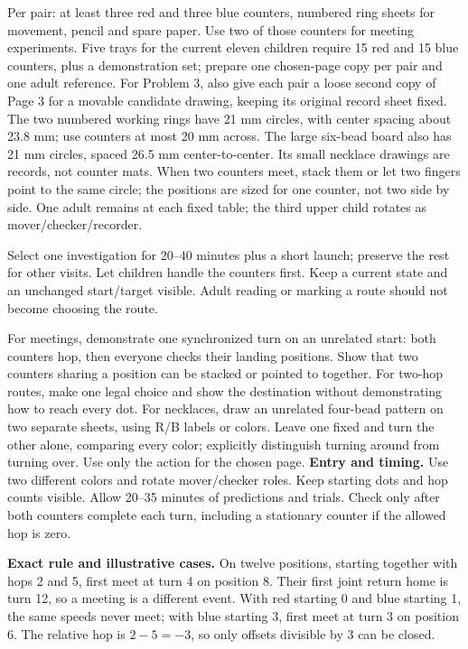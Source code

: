 Per pair: at least three red and three blue counters, numbered ring sheets for movement, pencil and spare paper. Use two of those counters for meeting experiments. Five trays for the current eleven children require 15 red and 15 blue counters, plus a demonstration set; prepare one chosen-page copy per pair and one adult reference. For Problem 3, also give each pair a loose second copy of Page 3 for a movable candidate drawing, keeping its original record sheet fixed. The two numbered working rings have 21 mm circles, with center spacing about 23.8 mm; use counters at most 20 mm across. The large six-bead board also has 21 mm circles, spaced 26.5 mm center-to-center. Its small necklace drawings are records, not counter mats. When two counters meet, stack them or let two fingers point to the same circle; the positions are sized for one counter, not two side by side. One adult remains at each fixed table; the third upper child rotates as mover/checker/recorder.

Select one investigation for 20--40 minutes plus a short launch; preserve the rest for other visits. Let children handle the counters first. Keep a current state and an unchanged start/target visible. Adult reading or marking a route should not become choosing the route.

For meetings, demonstrate one synchronized turn on an unrelated start: both counters hop, then everyone checks their landing positions. Show that two counters sharing a position can be stacked or pointed to together. For two-hop routes, make one legal choice and show the destination without demonstrating how to reach every dot. For necklaces, draw an unrelated four-bead pattern on two separate sheets, using R/B labels or colors. Leave one fixed and turn the other alone, comparing every color; explicitly distinguish turning around from turning over. Use only the action for the chosen page.
\newpage
{}
\textbf{Entry and timing.} Use two different colors and rotate mover/checker roles. Keep starting dots and hop counts visible. Allow 20--35 minutes of predictions and trials. Check only after both counters complete each turn, including a stationary counter if the allowed hop is zero.

\textbf{Exact rule and illustrative cases.} On twelve positions, starting together with hops 2 and 5, first meet at turn 4 on position 8. Their first joint return home is turn 12, so a meeting is a different event. With red starting 0 and blue starting 1, the same speeds never meet; with blue starting 3, first meet at turn 3 on position 6. The relative hop is $2-5=-3$, so only offsets divisible by 3 can be closed.

